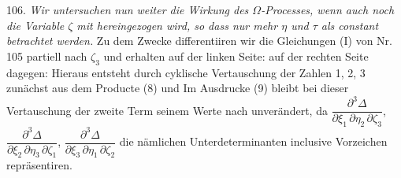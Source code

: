 106. \textit{Wir untersuchen nun weiter die Wirkung des $\Omega$-Processes, wenn auch noch die Variable $\zeta$ mit hereingezogen wird, so dass nur mehr $\eta$ und $\tau$ als constant betrachtet werden.} Zu dem Zwecke differentiiren wir die Gleichungen (I) von Nr. 105 partiell nach $\zeta_3$ und erhalten auf der linken Seite:
auf der rechten Seite dagegen:
Hieraus entsteht durch cyklische Vertauschung der Zahlen 1, 2, 3 zun\"achst aus dem Producte (8)
und
Im Ausdrucke (9) bleibt bei dieser Vertauschung der zweite Term seinem Werte nach unver\"andert, da $\dfrac{\partial^3 \Delta}{\partial \xi_1\, \partial \eta_2\, \partial \zeta_3}$, $\dfrac{\partial^3 \Delta}{\partial \xi_2\, \partial \eta_3\, \partial \zeta_1}$, $\dfrac{\partial^3 \Delta}{\partial \xi_3\, \partial \eta_1\, \partial \zeta_2}$ die n\"amlichen Unterdeterminanten inclusive Vorzeichen repr\"asentiren.


